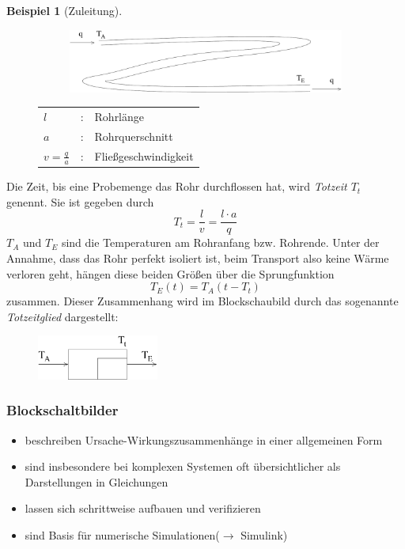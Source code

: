 \documentclass[12pt,a4paper,ngerman]{scrartcl}
\newtheorem{bsp}{Beispiel}[section] %
\begin{document}
\begin{bsp}[Zuleitung]
\end{bsp}
\begin{figure}[H]
\begin{minipage}{.6\linewidth}
\begin{figure}[H]
 \includegraphics[width=.9\linewidth]{sysregel_bsp_5} 
\end{figure}
\end{minipage}
\begin{minipage}{.4\linewidth}
\begin{tabular}{lll}
$l$&:& Rohrlänge\\
$a$&:&Rohrquerschnitt\\
$v=\frac{q}{a}$&:& Fließgeschwindigkeit
\end{tabular}
\end{minipage}
\end{figure}

Die Zeit, bis eine Probemenge das Rohr durchflossen hat, wird \emph{Totzeit $T_t$} genennt. Sie ist gegeben durch
\begin{equation*}
  T_t=\frac{l}{v}=\frac{l \cdot a}{q}
\end{equation*}
$T_A$ und $T_E$ sind die Temperaturen am Rohranfang bzw. Rohrende. Unter der Annahme, dass das Rohr perfekt isoliert ist, beim Transport also keine Wärme verloren geht, hängen diese beiden Größen über die Sprungfunktion
\begin{equation*}
  T_E(t)=T_A(t-T_t)
\end{equation*}
zusammen. Dieser Zusammenhang wird im Blockschaubild durch das sogenannte \emph{Totzeitglied} dargestellt:
\begin{figure}[H]
  \includegraphics[width=4cm]{sysregel_tglied}
\end{figure}

\subsubsection*{Blockschaltbilder}
\begin{itemize}
\item beschreiben Ursache-Wirkungszusammenhänge in einer allgemeinen Form
\item sind insbesondere bei komplexen Systemen oft übersichtlicher als Darstellungen in Gleichungen
\item lassen sich schrittweise aufbauen und verifizieren
\item sind Basis für numerische Simulationen($\rightarrow$ Simulink)
\end{itemize}
\end{document}
